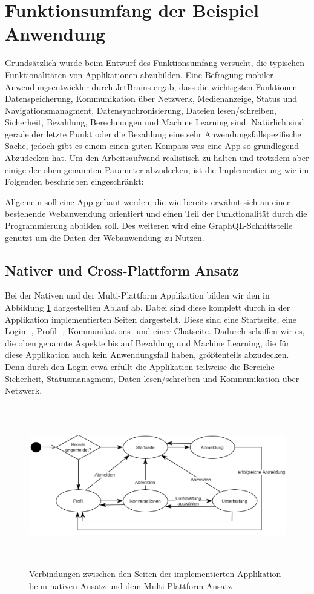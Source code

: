 \section{Funktionsumfang der Beispiel Anwendung}
Grundsätzlich wurde beim Entwurf des Funktionsumfang versucht, die typischen Funktionalitäten von Applikationen abzubilden. Eine Befragung mobiler Anwendungsentwickler durch JetBrains ergab, dass die wichtigsten Funktionen Datenspeicherung, Kommunikation über Netzwerk, Medienanzeige, Status und Navigationsmanagment, Datensynchronisierung, Dateien lesen/schreiben, Sicherheit, Bezahlung, Berechnungen und Machine Learning sind\cite{JetBrains_miscellaneous_2021}. Natürlich sind gerade der letzte Punkt oder die Bezahlung eine sehr Anwendungsfallspezifische Sache, jedoch gibt es einem einen guten Kompass was eine App so grundlegend Abzudecken hat.
Um den Arbeitsaufwand realistisch zu halten und trotzdem aber einige der oben genannten Parameter abzudecken, ist die Implementierung wie im Folgenden beschrieben eingeschränkt:

Allgemein soll eine App gebaut werden, die wie bereits erwähnt sich an einer bestehende Webanwendung orientiert und einen Teil der Funktionalität durch die Programmierung abbilden soll. Des weiteren wird eine GraphQL-Schnittstelle genutzt um die Daten der Webanwendung zu Nutzen. 

\subsection{Nativer und Cross-Plattform Ansatz}
Bei der Nativen und der Multi-Plattform Applikation bilden wir den in Abbildung \ref{fig:pageflow} dargestellten Ablauf ab. Dabei sind diese komplett durch in der Applikation implementierten Seiten dargestellt. Diese sind eine Startseite, eine Login- , Profil- , Kommunikations- und einer Chatseite. Dadurch schaffen wir es, die oben genannte Aspekte bis auf Bezahlung und Machine Learning, die für diese Applikation auch kein Anwendungsfall haben, größtenteils abzudecken. Denn durch den Login etwa erfüllt die Applikation teilweise die Bereiche Sicherheit, Statusmanagment, Daten lesen/schreiben und Kommunikation über Netzwerk. 

\begin{figure}[ht]
  \centering
  \includegraphics[height=7cm,keepaspectratio]{images/Pageflow_native_flutter.png} 
  \caption{Verbindungen zwischen den Seiten der implementierten Applikation beim nativen Ansatz und dem Multi-Plattform-Ansatz}
  \label{fig:pageflow}
\end{figure}


